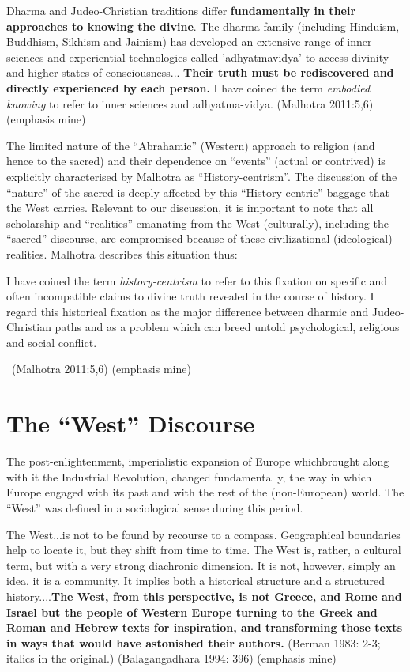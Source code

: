Dharma and Judeo-Christian traditions differ \textbf{fundamentally in their approaches to knowing the divine}. The dharma family (including Hinduism, Buddhism, Sikhism and Jainism) has developed an extensive range of inner sciences and experiential technologies called 'adhyatmavidya' to access divinity and higher states of consciousness... \textbf{Their truth must be rediscovered and directly experienced by each person.} I have coined the term \textit{embodied knowing} to refer to inner sciences and adhyatma-vidya. \hfill (Malhotra 2011:5,6) (emphasis mine)

The limited nature of the “Abrahamic” (Western) approach to religion (and hence to the sacred) and their dependence on “events” (actual or contrived) is explicitly characterised by Malhotra as “History-centrism”. The discussion of the “nature” of the sacred is deeply affected by this “History-centric” baggage that the West carries. Relevant to our discussion, it is important to note that all scholarship and “realities” emanating from the West (culturally), including the “sacred” discourse, are compromised because of these civilizational (ideological) realities. Malhotra describes this situation thus:

\begin{myquote}
I have coined the term \textit{history-centrism} to refer to this fixation on specific and often incompatible claims to divine truth revealed in the course of history. I regard this historical fixation as the major difference between dharmic and Judeo-Christian paths and as a problem which can breed untold psychological, religious and social conflict. 

~\hfill (Malhotra 2011:5,6) (emphasis mine)
\end{myquote}


\section*{The “West” Discourse}

The post-enlightenment, imperialistic expansion of Europe which\break brought along with it the Industrial Revolution, changed fundamentally, the way in which Europe engaged with its past and with the rest of the (non-European) world. The “West” was defined in a sociological sense during this period.

The West...is not to be found by recourse to a compass. Geographical boundaries help to locate it, but they shift from time to time. The West is, rather, a cultural term, but with a very strong diachronic dimension. It is not, however, simply an idea, it is a community. It implies both a historical structure and a structured history....\textbf{The West, from this perspective, is not Greece, and Rome and Israel but the people of Western Europe turning to the Greek and Roman and Hebrew texts for inspiration, and transforming those texts in ways that would have astonished their authors.} (Berman 1983: 2-3; italics in the original.) \hfill (Balagangadhara 1994: 396) (emphasis mine)

